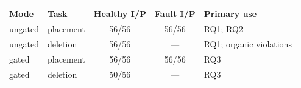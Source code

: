 \begin{tabular}{@{}l l c c l@{}}
\hline
\textbf{Mode} & \textbf{Task} & \textbf{Healthy I/P} & \textbf{Fault I/P} & \textbf{Primary use} \\
\hline
ungated & placement & 56/56 & 56/56 & RQ1; RQ2 \\
ungated & deletion & 56/56 & --- & RQ1; organic violations \\
gated & placement & 56/56 & 56/56 & RQ3 \\
gated & deletion & 50/56 & --- & RQ3 \\
\hline
\end{tabular}
